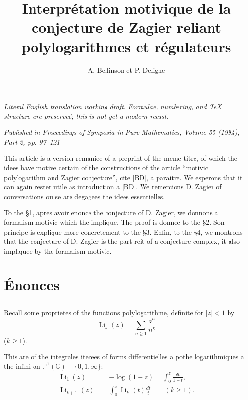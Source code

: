 \documentclass[12pt,a4paper]{article}
\title{\textbf{Interpr{\'e}tation motivique de la conjecture de Zagier reliant polylogarithmes et r{\'e}gulateurs}}
\author{A. Beilinson et P. Deligne}
\date{}
\theoremstyle{plain}
\theoremstyle{definition}
\theoremstyle{remark}
\newcommand{\C}{\mathbb{C}}
\newcommand{\IP}{\mathbb{P}}
\begin{document}
\begin{center}\small\emph{Literal English translation working draft. Formulae, numbering, and TeX structure are preserved; this is not yet a modern recast.}\end{center}
\vspace{0.5em}


\maketitle

\begin{center}
\textit{Published in Proceedings of Symposia in Pure Mathematics, Volume 55 (1994), Part 2, pp. 97--121}
\end{center}

\bigskip

This article is a version remani{e}e of a preprint of the m{e}me titre, of which the id{e}es have motiv{e} certain of the constructions of the article ``motivic polylogarithm and Zagier conjecture'', cit{e} [BD], {a} para{i}tre. We esp{e}rons that it can again rester utile as introduction {a} [BD]. We remercions D. Zagier of conversations o{u} se are d{e}gag{e}es the id{e}es essentielles.

\medskip

To the \S 1, apr{e}s avoir {e}nonc{e} the conjecture of D. Zagier, we donnons a formalism motivic which the implique. The proof is donn{e}e to the \S 2. Son principe is expliqu{e} more concr{e}tement to the \S 3. Enfin, to the \S 4, we montrons that the conjecture of D. Zagier is the part r{e}it of a conjecture complex, it also impliqu{e}e by the formalism motivic.

\section{{\'E}nonc{e}s}

\subsection{}

Recall some propri{e}t{e}s of the functions polylogarithme, d{e}finite for $|z|<1$ by
\begin{equation}\label{eq:1.1.1}
\operatorname{Li}_k(z) = \sum_{n\geq 1} \frac{z^n}{n^k}
\tag{1.1.1}
\end{equation}
($k\geq 1$).

This are of the int{e}grales it{e}r{e}es of forms diff{e}rentielles {a} p{o}the logarithmiques {a} the infini on $\IP^1(\C)-\{0,1,\infty\}$:
\begin{equation}\label{eq:1.1.2}
\begin{aligned}
\operatorname{Li}_1(z) &= -\log(1-z) = \int_0^z \frac{dt}{1-t},\\
\operatorname{Li}_{k+1}(z) &= \int_0^z \operatorname{Li}_k(t)\frac{dt}{t} \qquad (k\geq 1).
\end{aligned}
\tag{1.1.2}
\end{equation}
\end{document}
